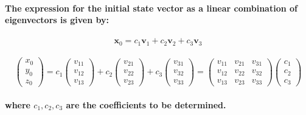 \paragraph{The expression for the initial state vector as a linear combination of eigenvectors is given by:}
% 
\paragraph{\[ \mathbf{x}_0 = c_1 \mathbf{v}_1 + c_2 \mathbf{v}_2 + c_3 \mathbf{v}_3 \]}
% 
% 
% 
% 
% 
% 
% 
\paragraph{$$
        \begin{pmatrix}
            x_0 \\ y_0 \\ z_0
        \end{pmatrix} =
        c_1 \begin{pmatrix}
            v_{11} \\ v_{12} \\ v_{13}
        \end{pmatrix} +
        c_2 \begin{pmatrix}
            v_{21} \\ v_{22} \\ v_{23}
        \end{pmatrix} +
        c_3 \begin{pmatrix}
            v_{31} \\ v_{32} \\ v_{33}
        \end{pmatrix}=
        \begin{pmatrix}
            v_{11} & v_{21} & v_{31} \\
            v_{12} & v_{22} & v_{32} \\
            v_{13} & v_{23} & v_{33}
        \end{pmatrix}
        \begin{pmatrix}
            c_1 \\ c_2 \\ c_3
        \end{pmatrix}
    $$}
% 
% 
% 
% 
% 
% 
% 
% 
% 
\paragraph{where \(c_1, c_2, c_3\) are the coefficients to be determined.}
% 
